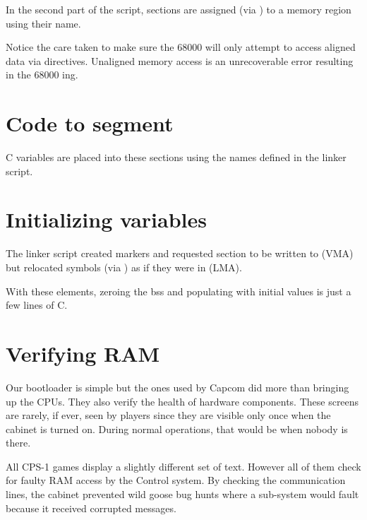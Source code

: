 

In the second part of the script, sections are assigned (via \textbf{\red{\textgreater}}) to a memory region using their  name.

\begin{trivia}
Notice the care taken to make sure the 68000 will only attempt to access aligned data via  directives. Unaligned memory access is an unrecoverable error resulting in the 68000 ing.
\end{trivia}


\section{Code to segment}

C variables are placed into these sections using the names defined in the linker script.





\section{Initializing variables}
The linker script created markers and requested section  to be written to  (VMA) but relocated symbols (via \textbf{}) as if they were in  (LMA).

With these elements, zeroing the bss and populating  with initial values is just a few lines of C.



\pagebreak
\section{Verifying RAM}
Our bootloader is simple but the ones used by Capcom did more than bringing up the CPUs. They also verify the health of hardware components. These screens are rarely, if ever, seen by players since they are visible only once when the cabinet is turned on. During normal operations, that would be when nobody is there.

All CPS-1 games display a slightly different set of text. However all of them check for faulty RAM access by the Control system. By checking the communication lines, the cabinet prevented wild goose bug hunts where a sub-system would fault because it received corrupted messages. 

